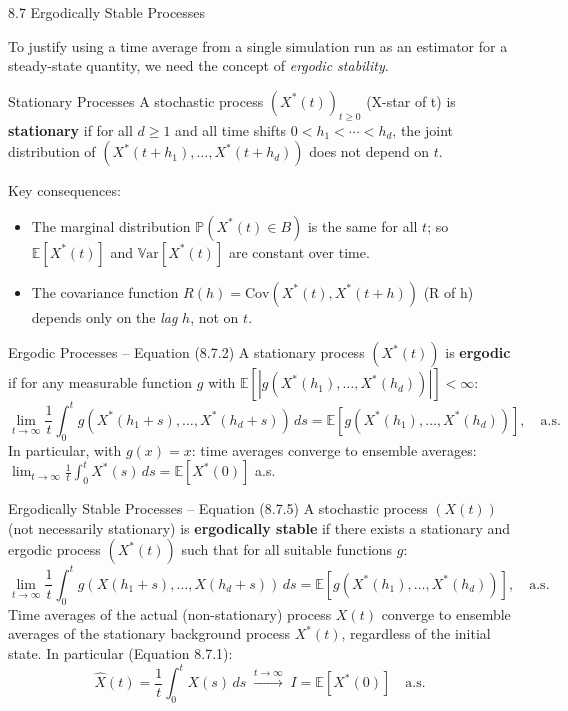 \documentclass[aspectratio=169,10pt]{beamer}
\newcommand{\E}{\mathbb{E}}
\newcommand{\Var}{\mathbb{V}\mathrm{ar}}
\newcommand{\Prob}{\mathbb{P}}
\begin{document}
\begin{frame}[allowframebreaks]{8.7 Ergodically Stable Processes}

To justify using a time average from a single simulation run as an estimator for
a steady-state quantity, we need the concept of \emph{ergodic stability}.

\begin{block}{Stationary Processes}
A stochastic process $(X^*(t))_{t\ge 0}$ (X-star of t) is \textbf{stationary}
if for all $d \ge 1$ and all time shifts $0 < h_1 < \cdots < h_d$, the joint
distribution of $(X^*(t+h_1), \ldots, X^*(t+h_d))$ does not depend on $t$.

Key consequences:
\begin{itemize}
  \item The marginal distribution $\Prob(X^*(t) \in B)$ is the same for all $t$;
        so $\E[X^*(t)]$ and $\Var[X^*(t)]$ are constant over time.
  \item The covariance function $R(h) = \mathrm{Cov}(X^*(t), X^*(t+h))$ (R of h)
        depends only on the \emph{lag} $h$, not on $t$.
\end{itemize}
\end{block}

\begin{block}{Ergodic Processes -- Equation (8.7.2)}
A stationary process $(X^*(t))$ is \textbf{ergodic} if for any measurable
function $g$ with $\E[|g(X^*(h_1),\ldots,X^*(h_d))|] < \infty$:
\[
  \lim_{t\to\infty} \frac{1}{t}\int_0^t g(X^*(h_1+s), \ldots, X^*(h_d+s))\,ds
  = \E[g(X^*(h_1), \ldots, X^*(h_d))], \quad \text{a.s.}
\]
In particular, with $g(x) = x$: time averages converge to ensemble averages:
$\lim_{t\to\infty}\frac{1}{t}\int_0^t X^*(s)\,ds = \E[X^*(0)]$ a.s.
\end{block}

\framebreak

\begin{block}{Ergodically Stable Processes -- Equation (8.7.5)}
A stochastic process $(X(t))$ (not necessarily stationary) is
\textbf{ergodically stable} if there exists a stationary and ergodic process
$(X^*(t))$ such that for all suitable functions $g$:
\[
  \lim_{t\to\infty} \frac{1}{t}\int_0^t g(X(h_1+s), \ldots, X(h_d+s))\,ds
  = \E[g(X^*(h_1), \ldots, X^*(h_d))], \quad \text{a.s.}
\]
Time averages of the actual (non-stationary) process $X(t)$ converge to ensemble
averages of the stationary background process $X^*(t)$, regardless of the initial
state.  In particular (Equation 8.7.1):
\[
  \hat{X}(t) = \frac{1}{t}\int_0^t X(s)\,ds \;\xrightarrow{t\to\infty}\; I
  = \E[X^*(0)] \quad \text{a.s.}
\]
\end{block}


\end{frame}
\end{document}
